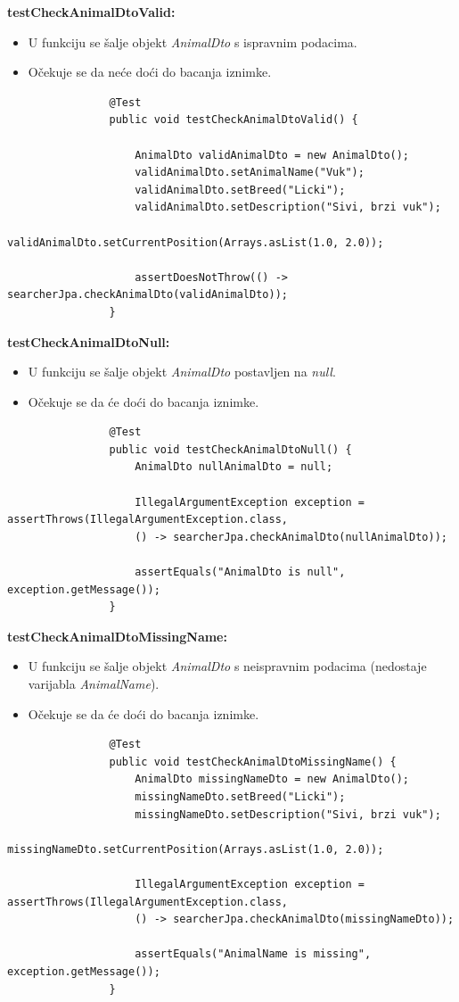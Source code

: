 			\textbf{testCheckAnimalDtoValid:}
			\begin{itemize}
				\item U funkciju se šalje objekt \textit{AnimalDto} s ispravnim podacima.
				\item Očekuje se da neće doći do bacanja iznimke.
			\end{itemize}
			\begin{lstlisting}
				@Test
				public void testCheckAnimalDtoValid() {
					
					AnimalDto validAnimalDto = new AnimalDto();
					validAnimalDto.setAnimalName("Vuk");
					validAnimalDto.setBreed("Licki");
					validAnimalDto.setDescription("Sivi, brzi vuk");
					validAnimalDto.setCurrentPosition(Arrays.asList(1.0, 2.0));
					
					assertDoesNotThrow(() -> searcherJpa.checkAnimalDto(validAnimalDto));
				}
			\end{lstlisting}
			
			\textbf{testCheckAnimalDtoNull:}
			\begin{itemize}
				\item U funkciju se šalje objekt \textit{AnimalDto} postavljen na \textit{null}.
				\item Očekuje se da će doći do bacanja iznimke.
			\end{itemize}
			\begin{lstlisting}
				@Test
				public void testCheckAnimalDtoNull() {
					AnimalDto nullAnimalDto = null;
					
					IllegalArgumentException exception = assertThrows(IllegalArgumentException.class,
					() -> searcherJpa.checkAnimalDto(nullAnimalDto));
					
					assertEquals("AnimalDto is null", exception.getMessage());
				}
			\end{lstlisting}
			
			\textbf{testCheckAnimalDtoMissingName:}
			\begin{itemize}
				\item U funkciju se šalje objekt \textit{AnimalDto} s neispravnim podacima (nedostaje varijabla \textit{AnimalName}).
				\item Očekuje se da će doći do bacanja iznimke.
			\end{itemize}
			\begin{lstlisting}
				@Test
				public void testCheckAnimalDtoMissingName() {
					AnimalDto missingNameDto = new AnimalDto();
					missingNameDto.setBreed("Licki");
					missingNameDto.setDescription("Sivi, brzi vuk");
					missingNameDto.setCurrentPosition(Arrays.asList(1.0, 2.0));
					
					IllegalArgumentException exception = assertThrows(IllegalArgumentException.class,
					() -> searcherJpa.checkAnimalDto(missingNameDto));
					
					assertEquals("AnimalName is missing", exception.getMessage());
				}
			\end{lstlisting}
			
